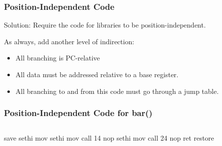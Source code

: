 \documentclass{plt}
\newcommand{\lab}[3]{\tikz{\useasboundingbox (0,0);
    \node [draw, anchor=west, fill=black!10,rectangle callout,
           callout absolute pointer={(1pt,3pt)}] at (#1,#2) {\rmfamily{#3}}; 
}}
\begin{document}
\begin{frame}
  \frametitle{Position-Independent Code}

Solution: Require the code for libraries to be
position-independent. 

As always, add another level of indirection:

\begin{itemize}
\item All branching is PC-relative

\item All data must be addressed relative to a base register.

\item All branching to and from this code must go through a jump table.
\end{itemize}

\end{frame}

\begin{frame}[fragile]
  \frametitle{Position-Independent Code for bar()}

  \begin{columns}
    \begin{column}[b]{0.3\textwidth}

\fontsize{8}{8}\selectfont
\begin{semiverbatim}
save  %
sethi  %
mov  %
sethi  %
mov  %
call  14
nop 
sethi  %
mov  %
call  24
nop 
ret 
restore 
\end{semiverbatim}
    \end{column}
    \begin{column}[b]{0.5\textwidth}
\fontsize{8}{8}\selectfont
{}
  \end{column}
  \end{columns}

\end{frame}
\end{document}
